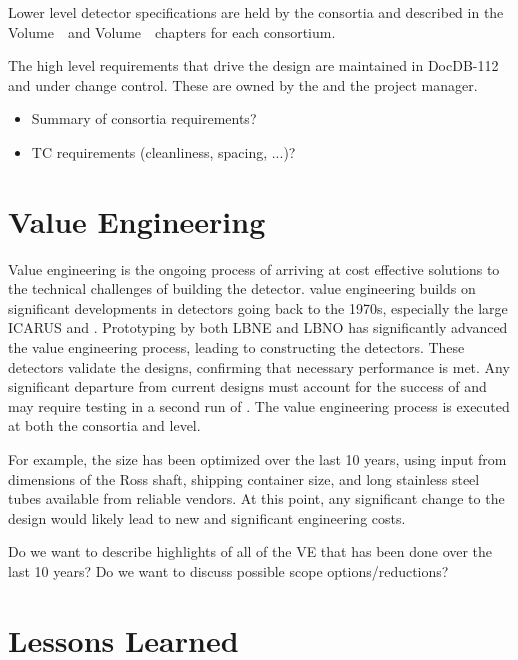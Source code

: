 Lower level detector specifications are held by the consortia and described in the   
Volume~\volnumbersp\ and  Volume~\volnumberdp\ chapters for
each consortium.

The high level  requirements that drive the  design are
maintained in DocDB-112 and under change control. These are owned by
the   and the  project manager.

\begin{itemize}
 \item Summary of consortia requirements?
 \item TC requirements (cleanliness,  spacing, ...)?
\end{itemize}


\section{Value Engineering}
\label{sec:fdsp-coord-ve}

Value engineering is the ongoing process of arriving at cost effective
solutions to the technical challenges of building the 
detector.  value engineering builds on significant
developments in  detectors going back to the 1970s,
especially the large  ICARUS and
. Prototyping by both LBNE and LBNO has
significantly advanced the value engineering process, leading to
constructing the  detectors. These detectors validate
the  designs, confirming that necessary performance is
met. Any significant departure from current designs must account for
the success of  and may require testing in a second
run of . The value engineering process is executed at
both the consortia and  level.

For example, the  size has been optimized over the last 10 years,
using input from dimensions of the Ross shaft, shipping container size,
and long stainless steel tubes available from reliable vendors.
At this point, any significant change to the  design would likely
lead to new and significant engineering costs.

Do we want to describe highlights of all of the VE that has been done
over the last 10 years? Do we want to discuss possible scope options/reductions?

\section{Lessons Learned}
\label{sec:fdsp-coord-lessons}

